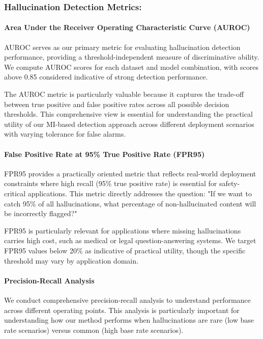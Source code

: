 \subsubsection{Hallucination Detection Metrics:}

\paragraph{Area Under the Receiver Operating Characteristic Curve (AUROC)}
AUROC serves as our primary metric for evaluating hallucination detection performance, providing a threshold-independent measure of discriminative ability. We compute AUROC scores for each dataset and model combination, with scores above 0.85 considered indicative of strong detection performance.

The AUROC metric is particularly valuable because it captures the trade-off between true positive and false positive rates across all possible decision thresholds. This comprehensive view is essential for understanding the practical utility of our MI-based detection approach across different deployment scenarios with varying tolerance for false alarms.

\paragraph{False Positive Rate at 95\% True Positive Rate (FPR95)}
FPR95 provides a practically oriented metric that reflects real-world deployment constraints where high recall (95\% true positive rate) is essential for safety-critical applications. This metric directly addresses the question: "If we want to catch 95\% of all hallucinations, what percentage of non-hallucinated content will be incorrectly flagged?"

FPR95 is particularly relevant for applications where missing hallucinations carries high cost, such as medical or legal question-answering systems. We target FPR95 values below 20\% as indicative of practical utility, though the specific threshold may vary by application domain.

\paragraph{Precision-Recall Analysis}
We conduct comprehensive precision-recall analysis to understand performance across different operating points. This analysis is particularly important for understanding how our method performs when hallucinations are rare (low base rate scenarios) versus common (high base rate scenarios).


